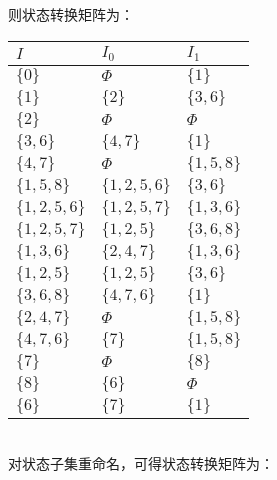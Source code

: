 \documentclass{article}
\begin{document}
则状态转换矩阵为：
\begin{table}[h]
    \centering
\begin{tabular}{|p{3cm}<{\centering}|p{3cm}<{\centering}|p{3cm}<{\centering}|}   
    \hline
    $I$ & $I_0$ & $I_1$ \\
    \hline
    $\{0\}$ & $\Phi$ & $\{1\}$ \\
    \hline
    $\{1\}$ & $\{2\}$ & $\{3,6\}$ \\
    \hline
    $\{2\}$ & $\Phi$ & $\Phi$ \\
    \hline
    $\{3,6\}$ & $\{4,7\}$ & $\{1\}$ \\
    \hline
    $\{4,7\}$ & $\Phi$ & $\{1,5,8\}$ \\
    \hline
    $\{1,5,8\}$ & $\{1,2,5,6\}$ & $\{3,6\}$ \\
    \hline
    $\{1,2,5,6\}$ & $\{1,2,5,7\}$ & $\{1,3,6\}$ \\
    \hline
    $\{1,2,5,7\}$ & $\{1,2,5\}$ & $\{3,6,8\}$ \\
    \hline
    $\{1,3,6\}$ & $\{2,4,7\}$ & $\{1,3,6\}$ \\
    \hline
    $\{1,2,5\}$ & $\{1,2,5\}$ & $\{3,6\}$ \\
    \hline
    $\{3,6,8\}$ & $\{4,7,6\}$ & $\{1\}$ \\
    \hline
    $\{2,4,7\}$ & $\Phi$ & $\{1,5,8\}$ \\
    \hline
    $\{4,7,6\}$ & $\{7\}$ & $\{1,5,8\}$ \\
    \hline
    $\{7\}$ & $\Phi$ & $\{8\}$ \\
    \hline
    $\{8\}$ & $\{6\}$ & $\Phi$ \\
    \hline
    $\{6\}$ & $\{7\}$ & $\{1\}$ \\
    \hline
\end{tabular}
\end{table}
\ \\
对状态子集重命名，可得状态转换矩阵为：
\end{document}
